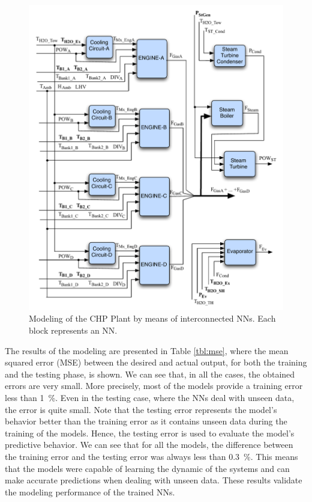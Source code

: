 \begin{figure}
\includegraphics[width=1\textwidth]{NNs.pdf}
\caption{Modeling of the CHP Plant by means of interconnected NNs. Each block represents an NN.}
\label{fignns}
\end{figure}

The results of the modeling are presented in Table \ref{tbl:mse}, where the mean squared error (MSE) between the desired and actual output, for both the training and the testing phase, is shown. We can see that, in all the cases, the obtained  errors are very small. More precisely, most of the models provide a training error less than \SI{1}{\percent}. Even in the testing case, where the NNs deal with unseen data, the error is quite small. Note that the testing error represents the model's behavior better than the training error as it contains unseen data during the training of the models. Hence, the testing error is used to evaluate the  model's  predictive behavior. We can see that for all the models, the difference between the training error and the testing error was always less than \SI{0.3}{\percent}. This means that the models were capable of learning the dynamic of the systems and can make accurate predictions when dealing with unseen data. These results validate the modeling performance of the trained NNs. 



